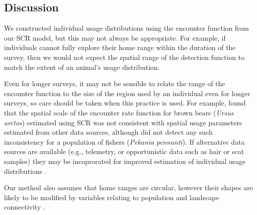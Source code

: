 \documentclass[10pt,a4paper]{article}\usepackage[]{graphicx}\usepackage[]{color}
\begin{document}
\subsection{Discussion}


We constructed individual usage distributions using the encounter
function from our SCR model, but this may not always be
appropriate. For example, if individuals cannot fully explore their
home range within the duration of the survey, then we would not expect
the spatial range of the detection function to match the extent of an
animal's usage distribution.

Even for longer surveys, it may not be sensible to relate the range of
the encounter function to the size of the region used by an individual
even for longer surveys, so care should be taken when this practice is
used. For example, \citet{Tenan+al:17} found that the spatial scale of
the encounter rate function for brown bears (\emph{Ursus arctos})
estimated using SCR was not consistent with spatial usage parameters
estimated from other data sources, although \citet{Popescu+al:14} did
not detect any such inconsistency for a population of fishers
(\emph{Pekania pennanti}). If alternative data sources are available
(e.g., telemetry, or opportunistic data such as hair or scat samples)
they may be incoprorated for improved estimation of individual usage
distributions \citep{Tenan+al:17}.

Our method also assumes that home ranges are circular, however their
shapes are likely to be modified by variables relating to population
and landscape connectivity \citep[see][for a review]{Drake+al:ip}.


 
\end{document}
